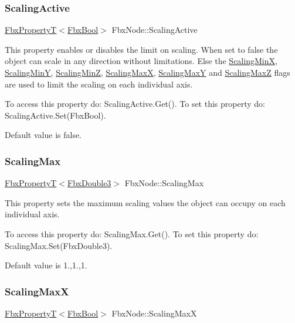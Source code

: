 \subsubsection{\texorpdfstring{Scaling\+Active}{ScalingActive}}
{\footnotesize\ttfamily \hyperlink{class_fbx_property_t}{Fbx\+PropertyT}$<$\hyperlink{fbxtypes_8h_a92e0562b2fe33e76a242f498b362262e}{Fbx\+Bool}$>$ Fbx\+Node\+::\+Scaling\+Active}

This property enables or disables the limit on scaling. When set to {\ttfamily false} the object can scale in any direction without limitations. Else the \hyperlink{class_fbx_node_ad47427b4a9e01ab8e08a0a589a0f1c43}{Scaling\+MinX}, \hyperlink{class_fbx_node_ac152b4cc6a615ef0e98b802807f060da}{Scaling\+MinY}, \hyperlink{class_fbx_node_aba3dd61a9e6d3d553fe0a16e1027ba2b}{Scaling\+MinZ}, \hyperlink{class_fbx_node_a2c2926361960045a1719befae430bac0}{Scaling\+MaxX}, \hyperlink{class_fbx_node_a6a515f87577f63a57a7fe8a6c971d9ad}{Scaling\+MaxY} and \hyperlink{class_fbx_node_af4c72a83f64207cbcad432a5f48432af}{Scaling\+MaxZ} flags are used to limit the scaling on each individual axis.

To access this property do\+: Scaling\+Active.\+Get(). To set this property do\+: Scaling\+Active.\+Set(\+Fbx\+Bool).

Default value is false. \mbox{\label{class_fbx_node_a530a22a286aa932f665abfa1bbda2ea8}} 
\subsubsection{\texorpdfstring{Scaling\+Max}{ScalingMax}}
{\footnotesize\ttfamily \hyperlink{class_fbx_property_t}{Fbx\+PropertyT}$<$\hyperlink{fbxtypes_8h_ae0a96f14cde566774c7553aa7523b7a7}{Fbx\+Double3}$>$ Fbx\+Node\+::\+Scaling\+Max}

This property sets the maximum scaling values the object can occupy on each individual axis.

To access this property do\+: Scaling\+Max.\+Get(). To set this property do\+: Scaling\+Max.\+Set(\+Fbx\+Double3).

Default value is 1.,1.,1. \mbox{\label{class_fbx_node_a2c2926361960045a1719befae430bac0}} 
\subsubsection{\texorpdfstring{Scaling\+MaxX}{ScalingMaxX}}
{\footnotesize\ttfamily \hyperlink{class_fbx_property_t}{Fbx\+PropertyT}$<$\hyperlink{fbxtypes_8h_a92e0562b2fe33e76a242f498b362262e}{Fbx\+Bool}$>$ Fbx\+Node\+::\+Scaling\+MaxX}

